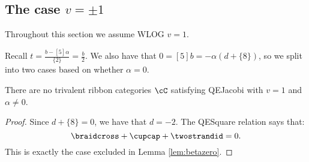 \documentclass[12pt]{amsart}
\begin{document}
\subsection{The case \texorpdfstring{$v = \pm 1$}{v = pm 1}}

Throughout this section we assume WLOG $v=1$.

Recall $t = \frac{b-[5]\alpha}{\{2\}} = \frac{b}{2}$.  We also have that $0= [5]b = -\alpha (d+\{8\})$, so we split into two cases based on whether $\alpha = 0$.

\begin{lemma}
There are no trivalent ribbon categories $\cC$ satisfying QEJacobi with $v=1$ and $\alpha \neq 0$.
\end{lemma}
\begin{proof}
Since $d+\{8\}=0$, we have that $d=-2$.  The QESquare relation says that:
$$\braidcross + \cupcap + \twostrandid = 0.$$
This is exactly the case excluded in Lemma \ref{lem:betazero}.
\end{proof}
\end{document}
